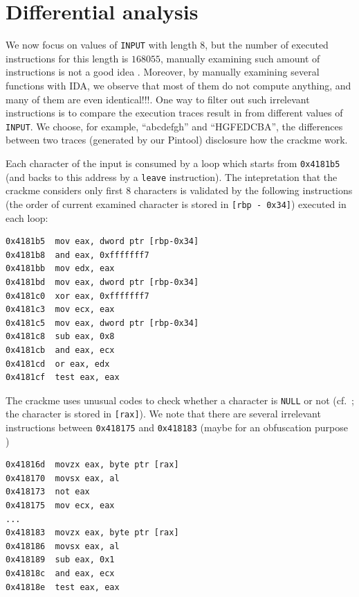 \documentclass{easychair}
\begin{document}
\section{Differential analysis}
We now focus on values of \texttt{INPUT} with length $8$, but the number of executed instructions for this length is $168055$, manually examining such amount of instructions is not a good idea \smiley{}. Moreover, by manually examining several functions with IDA, we observe that most of them do not compute anything, and  many of them are even  identical!!!. One way to filter out such irrelevant instructions is to compare the execution traces result in from different values of \texttt{INPUT}. We choose, for example, ``abcdefgh'' and ``HGFEDCBA'', the differences between two traces (generated by our Pintool) disclosure how the crackme work.

Each character of the input is consumed by a loop which starts from \texttt{0x4181b5} (and backs to this address by a \texttt{leave} instruction). The intepretation that the crackme considers only first $8$ characters is validated by the following instructions (the order of current examined character is stored in \texttt{[rbp - 0x34]}) executed in each loop:
\begin{lstlisting}[frame=lines, caption={Checking if length is $8$}, captionpos=b, boxpos=b, language={[x86masm]Assembler}, label=lst:checklength]
0x4181b5  mov eax, dword ptr [rbp-0x34]
0x4181b8  and eax, 0xfffffff7
0x4181bb  mov edx, eax
0x4181bd  mov eax, dword ptr [rbp-0x34]
0x4181c0  xor eax, 0xfffffff7
0x4181c3  mov ecx, eax
0x4181c5  mov eax, dword ptr [rbp-0x34]
0x4181c8  sub eax, 0x8
0x4181cb  and eax, ecx
0x4181cd  or eax, edx
0x4181cf  test eax, eax
\end{lstlisting}
The crackme uses unusual codes to check whether a character is \texttt{NULL} or not (cf.~; the character is stored in \texttt{[rax]}). We note that there are several irrelevant instructions between \texttt{0x418175} and \texttt{0x418183} (maybe for an obfuscation purpose \smiley{})
\begin{lstlisting}[frame=lines, caption={Checking if character is \texttt{NULL}}, captionpos=b, boxpos=b, language={[x86masm]Assembler}, label=lst:checknull]
0x41816d  movzx eax, byte ptr [rax]
0x418170  movsx eax, al
0x418173  not eax
0x418175  mov ecx, eax
...
0x418183  movzx eax, byte ptr [rax]
0x418186  movsx eax, al
0x418189  sub eax, 0x1
0x41818c  and eax, ecx
0x41818e  test eax, eax
\end{lstlisting}
\end{document}
